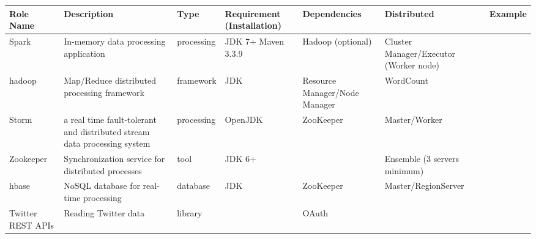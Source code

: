 \documentclass[9pt,twocolumn,twoside]{styles/osajnl}
\begin{document}
\begin{table}[htb]
  \begin{center}
    \begin{small}
      \begin{tabular}{l|l|l|l|l|l|l}

	Role Name & Description & Type & Requirement (Installation) & Dependencies & Distributed & Example \tabularnewline \hline \hline
	Spark & In-memory data processing application & processing & JDK 7+ Maven 3.3.9 & Hadoop (optional) & 	Cluster Manager/Executor (Worker node) & 	 &  \\ \hline

	hadoop & 
	Map/Reduce distributed processing framework & 
	framework & 
	JDK & 
	Resource Manager/Node Manager & 
	WordCount &   \\ \hline

	Storm & 
	a real time fault-tolerant and distributed stream data processing system & 
	processing & 
	OpenJDK & 
	ZooKeeper &
	Master/Worker &
	\\ \hline

	Zookeeper & 
	Synchronization service for distributed processes & 
	tool & 
	JDK 6+ &  & 
	Ensemble (3 servers minimum) & 
	\\ \hline

	hbase & 
	NoSQL database for real-time processing & 
	database & 
	JDK & 
	ZooKeeper & 
	Master/RegionServer & 
\\ \hline

	Twitter REST APIs & Reading Twitter data & library & 	 & OAuth & &  \\ \hline
	

\end{tabular}
\end{small}
\end{center}
\end{table}
\end{document}
